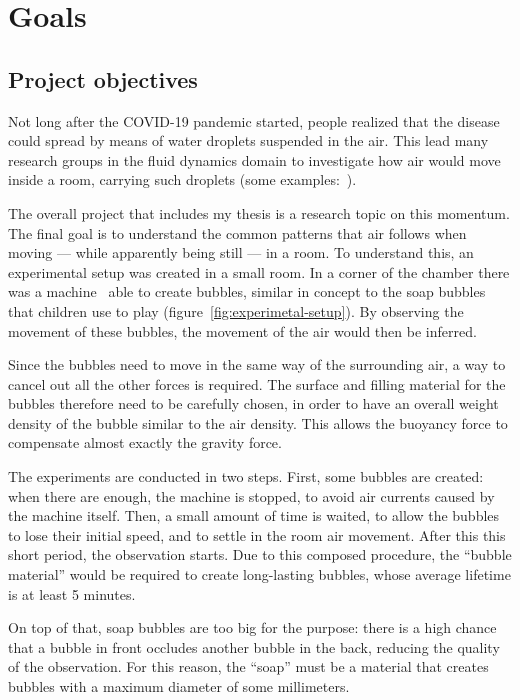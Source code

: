 \chapter{Goals}
\label{chap:goal}

\section{Project objectives}

Not long after the COVID-19 pandemic started, people realized that the disease could spread by means of water droplets suspended in the air.
This lead many research groups in the fluid dynamics domain to investigate how air would move inside a room, carrying such droplets (some examples:~\cite{covid-air-1}\cite{covid-air-2}).

The overall project that includes my thesis is a research topic on this momentum.
The final goal is to understand the common patterns that air follows when moving --- while apparently being still --- in a room.
To understand this, an experimental setup was created in a small room.
In a corner of the chamber there was a machine~\cite{bubble-machine} able to create bubbles, similar in concept to the soap bubbles that children use to play (figure~\ref{fig:experimetal-setup}). By observing the movement of these bubbles, the movement of the air would then be inferred.

Since the bubbles need to move in the same way of the surrounding air, a way to cancel out all the other forces is required.
The surface and filling material for the bubbles therefore need to be carefully chosen, in order to have an overall weight density of the bubble similar to the air density.
This allows the buoyancy force to compensate almost exactly the gravity force.

The experiments are conducted in two steps.
First, some bubbles are created: when there are enough, the machine is stopped, to avoid air currents caused by the machine itself.
Then, a small amount of time is waited, to allow the bubbles to lose their initial speed, and to settle in the room air movement.
After this this short period, the observation starts.
Due to this composed procedure, the ``bubble material'' would be required to create long-lasting bubbles, whose average lifetime is at least 5 minutes.

On top of that, soap bubbles are too big for the purpose: there is a high chance that a bubble in front occludes another bubble in the back, reducing the quality of the observation.
For this reason, the ``soap'' must be a material that creates bubbles with a maximum diameter of some millimeters.

